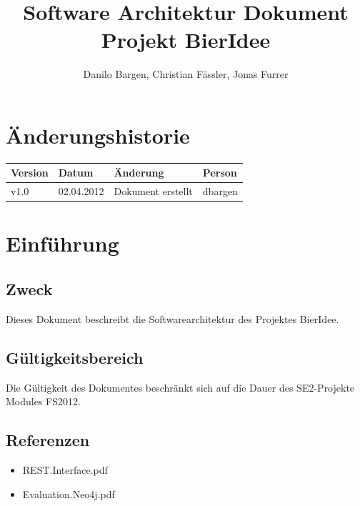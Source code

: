\documentclass[10pt,a4paper]{scrartcl}
\author{Danilo Bargen, Christian Fässler, Jonas Furrer}
\title{Software Architektur Dokument\\ Projekt BierIdee}
\begin{document}
\begin{titlepage}
	\maketitle
	\vspace{120mm}
	\thispagestyle{empty} %
\end{titlepage}

\tableofcontents
\newpage

\section*{Änderungshistorie}
\begin{tabular}{p{}p{}p{}p{}}
\toprule
\textbf{Version} & \textbf{Datum} & \textbf{Änderung} & \textbf{Person} \\  
\midrule
v1.0 & 02.04.2012 & Dokument erstellt & dbargen \\  
\bottomrule
\end{tabular} 
\newpage

\section{Einführung}

\subsection{Zweck}
Dieses Dokument beschreibt die Softwarearchitektur des Projektes BierIdee.

\subsection{Gültigkeitsbereich}
Die Gültigkeit des Dokumentes beschränkt sich auf die Dauer des SE2-Projekte Modules FS2012.

\subsection{Referenzen}

\begin{itemize}
	\item REST.Interface.pdf
	\item Evaluation.Neo4j.pdf
\end{itemize}
\end{document}
